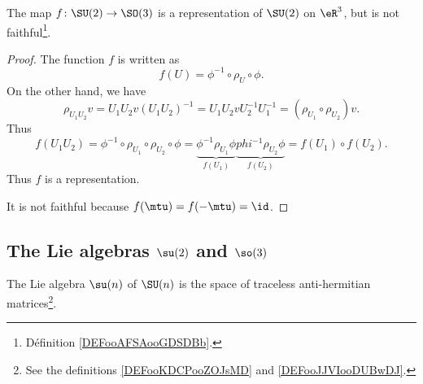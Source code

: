 \begin{proposition}
    The map \( f\colon \SU(2)\to \SO(3)\) is a representation of \( \SU(2)\) on \( \eR^3\), but is not faithful\footnote{Définition \ref{DEFooAFSAooGDSDBb}.}.
\end{proposition}

\begin{proof}
    The function \( f\) is written as
    \begin{equation}
        f(U)=\phi^{-1}\circ\rho_U\circ\phi.
    \end{equation}
    On the other hand, we have
    \begin{equation}
        \rho_{U_1U_2}v=U_1U_2v(U_1U_2)^{-1}=U_1U_2vU_2^{-1}U_1^{-1}=(\rho_{U_1}\circ\rho_{U_2})v.
    \end{equation}
    Thus
    \begin{equation}
        f(U_1U_2)=\phi^{-1}\circ\rho_{U_1}\circ\rho_{U_2}\circ\phi=\underbrace{\phi^{-1}\rho_{U_1}\phi}_{f(U_1)}\underbrace{phi^{-1}\rho_{U_2}\phi}_{f(U_2)}=f(U_1)\circ f(U_2).
    \end{equation}
    Thus \( f\) is a representation.

    It is not faithful because \( f(\mtu)=f(-\mtu)=\id\).
\end{proof}

\subsection{The Lie algebras \texorpdfstring{\( \su(2)\)}{su(2)} and \texorpdfstring{$ \so(3)$}{so(n)}}

\begin{proposition}         \label{PROPooSERWooFtxBgV}
    The Lie algebra \( \su(n)\) of \( \SU(n)\) is the space of traceless anti-hermitian matrices\footnote{See the definitions \ref{DEFooKDCPooZOJsMD} and \ref{DEFooJJVIooDUBwDJ}.}.
\end{proposition}

